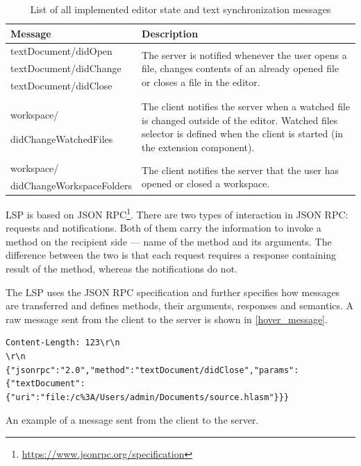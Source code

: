 \begin{table}
	\centering
	\begin{tabular}{ll}
		
		\toprule
		Message & Description \\ \midrule
		textDocument/didOpen & \multirow{3}{8.5cm}{The server is notified whenever the user opens a file, changes contents of an already opened file or closes a file in the editor.} \\
		textDocument/didChange & \\
		textDocument/didClose & \\
		& \\
		 &\multirow{4}{8.5cm}{The client notifies the server when a watched file is changed outside of the editor. Watched files selector is defined when the client is started (in the extension component).} \\
		workspace/ & \\
		didChangeWatchedFiles& \\
		& \\
		& \\
		workspace/ & \multirow{2}{8.5cm}{The client notifies the server that the user has opened or closed a workspace.} \\
		didChangeWorkspaceFolders & \\ \bottomrule
	\end{tabular}
	
	\caption{List of all implemented editor state and text synchronization messages}
	\label{lsp_text_sync_methods}
\end{table}


LSP is based on JSON RPC\footnote{\url{https://www.jsonrpc.org/specification}}. There are two types of interaction in JSON RPC: requests and notifications. Both of them carry the information to invoke a method on the recipient side ---  name of the method and its arguments. The difference between the two is that each request requires a response containing result of the method, whereas the notifications do not.

The LSP uses the JSON RPC specification and further specifies how messages are transferred and defines methods, their arguments, responses and semantics. A raw message sent from the client to the server is shown in \cref{hover_message}.

\begin{listing}
	\begin{verbatim}
Content-Length: 123\r\n
\r\n
{"jsonrpc":"2.0","method":"textDocument/didClose","params":{"textDocument":
{"uri":"file:/c%3A/Users/admin/Documents/source.hlasm"}}}
	\end{verbatim}
	\caption{An example of a message sent from the client to the server.}
	\label{hover_message}
\end{listing}

